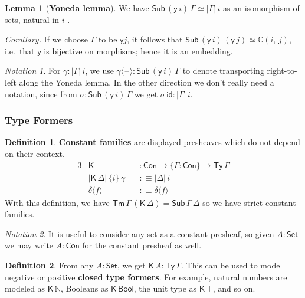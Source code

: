 \documentclass[12pt,a4paper,twoside,openany]{book}
\theoremstyle{remark}
\newtheorem{notation}{Notation}
\theoremstyle{definition}
\newtheorem{mydefinition}{Definition}
\newtheorem{mylemma}{Lemma}
\theoremstyle{theorem}
\newcommand{\ms}[1]{\mathsf{#1}}
\newcommand{\mbb}[1]{\mathbb{#1}}
\newcommand{\id}{\mathsf{id}}
\newcommand{\Con}{\mathsf{Con}}
\newcommand{\Sub}{\mathsf{Sub}}
\newcommand{\Tm}{\mathsf{Tm}}
\newcommand{\Ty}{\mathsf{Ty}}
\newcommand{\blank}{\mathord{\hspace{1pt}\text{--}\hspace{1pt}}}
\newcommand{\Set}{\mathsf{Set}}
\newcommand{\K}{\mathsf{K}}
\newcommand{\Bool}{\ms{Bool}}
\newcommand{\mbbC}{\mbb{C}}
\newcommand{\lab}{\langle}
\newcommand{\rab}{\rangle}
\newcommand{\defn}{:\equiv}
\newcommand{\yon}{\ms{y}}
\begin{document}
\begin{mylemma}[\textbf{Yoneda lemma}] We have $\Sub\,(\yon\,i)\,\Gamma \simeq |\Gamma|\,i$ as an isomorphism of sets, natural in $i$ \cite{TODO}.
\end{mylemma}

\noindent\emph{Corollary.} If we choose $\Gamma$ to be $\yon j$, it follows that
$\Sub\,(\yon\,i)\,(\yon\,j) \simeq \mbbC(i,\,j)$, i.e.\ that $\yon$ is
bijective on morphisms; hence it is an embedding.

\begin{notation}
\label{not:yoneda}
For $\gamma : |\Gamma|\,i$, we use $\gamma\lab \blank \rab :
\Sub\,(\yon\,i)\,\Gamma $ to denote transporting right-to-left along the Yoneda
lemma. In the other direction we don't really need a notation, since from
$\sigma : \Sub\,(\yon\,i)\,\Gamma$ we get $\sigma\,\id : |\Gamma|\,i$.
\end{notation}

\subsubsection{Type Formers}

\begin{mydefinition}
\label{def:k-psh}
\textbf{Constant families} are displayed presheaves which do not depend on their context.
\begin{alignat*}{3}
  & \K &&: \Con \to \{\Gamma : \Con \} \to \Ty\,\Gamma\\
  & |\K\,\Delta|\,\{i\}\,\gamma\,&&\defn |\Delta|\,i \\
  & \delta\lab f \rab &&\defn \delta \lab f \rab
\end{alignat*}
With this definition, we have $\Tm\,\Gamma\,(\K\,\Delta) = \Sub\,\Gamma\,\Delta$
so we have strict constant families.
\end{mydefinition}

\begin{notation}
It is useful to consider any set as a constant presheaf, so
given $A : \Set$ we may write $A : \Con$ for the constant presheaf
as well.
\end{notation}

\begin{mydefinition}
From any $A : \Set$, we get $\K\,A : \Ty\,\Gamma$. This can be used to
model negative or positive \textbf{closed type formers}. For example, natural
numbers are modeled as $\K\,\mbb{N}$, Booleans as $\K\,\Bool$, the unit type as
$\K\,\top$, and so on.
\end{mydefinition}
\end{document}

